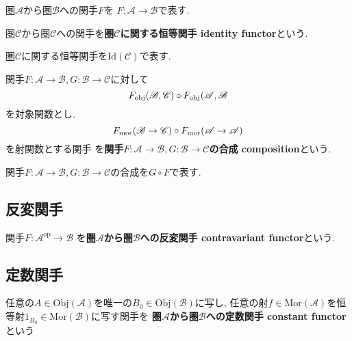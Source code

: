 \begin{Notation}
圏$\mathscr{A}$から圏$\mathscr{B}$への関手$F$を
$F:\mathscr{A}\rightarrow\mathscr{B}$で表す.
\end{Notation}
\begin{Def}
圏$\mathscr{C}$から圏$\mathscr{C}$への関手を{\bf 圏$\mathscr{C}$に関する恒等関手 identity functor}という.
\end{Def}
\begin{Notation}
圏$\mathscr{C}$に関する恒等関手を$\mathrm{Id}(\mathscr{C})$で表す.
\end{Notation}
\begin{Def}
関手$F:\mathscr{A}\rightarrow\mathscr{B},G:\mathscr{B}\rightarrow\mathscr{C}$に対して
\[F_{\rm obj}(\mathscr{B},\mathscr{C})\circ F_{\rm obj}(\mathscr{A},\mathscr{B}\]
を対象関数とし.
\[F_{\rm mor}(\mathscr{B}\rightarrow\mathscr{C})\circ F_{\rm mor}(\mathscr{A}\rightarrow\mathscr{A})\]
を射関数とする関手
を{\bf 関手$F:\mathscr{A}\rightarrow\mathscr{B},G:\mathscr{B}\rightarrow\mathscr{C}$の合成 composition}という.
\end{Def}
\begin{Notation}
関手$F:\mathscr{A}\rightarrow\mathscr{B},G:\mathscr{B}\rightarrow\mathscr{C}$の合成を$G\circ F$で表す.
\end{Notation}
\begin{comment}
\begin{example}
順序を保存する写像
\end{example}
\end{comment}
\begin{comment}
\begin{example}
圏と見做した順序集合間の簡単な関手の例
\end{example}
\end{comment}
\begin{comment}
*************************
\begin{example}
$n$次ホモロジー関手
\end{example}
***************************
\end{comment}

\subsection{反変関手}
\begin{Def}
関手$F:\mathscr{A}^{\mathrm{op}}\rightarrow\mathscr{B}$
を{\bf 圏$\mathscr{A}$から圏$\mathscr{B}$への反変関手 contravariant functor}という.
\end{Def}
\subsection{定数関手}
\begin{Def}
任意の$A\in\mathrm{Obj}(\mathscr{A})$を唯一の$B_0\in\mathrm{Obj}(\mathscr{B})$に写し,
任意の射$f\in\mathrm{Mor}(\mathscr{A})$を恒等射$1_{B_0}\in\mathrm{Mor}(\mathscr{B})$に写す関手を
{\bf 圏$\mathscr{A}$から圏$\mathscr{B}$への定数関手 constant functor}という
\end{Def}

